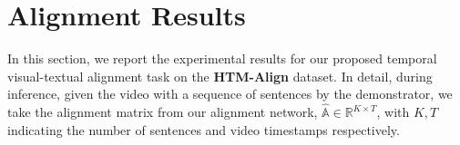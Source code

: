 \begin{comment}
\hfill
\begin{minipage}[b]{0.53\textwidth}
\centering
\footnotesize
\setlength\tabcolsep{4pt}

\begin{tabular}{c|ccc|c|cccc}
    \hline
    & \multicolumn{3}{c|}{losses} & settings  & \multicolumn{3}{c}{results on HTM-Align}               \\ \hline
    \# & $\mathcal{L}_{\text{TC}}$ & $\mathcal{L}_{\text{alignability}}$  & $\mathcal{L}_{\text{Order}}$  & {video length (s)} & Align-R@1$\uparrow$ & Align-Score$\uparrow$ & ROC AUC$\uparrow$ \\ \hline
    (a) & \multicolumn{3}{l|}{initialized with $\hat{\mathcal{L}}_{\text{TC}}$} & 128 & 32.5  & 22.0 & 69.9  \\ \hline
    (b) & \cmark & \xmark   & \xmark  & 128    & 33.8       & 22.2 & 72.0                 \\
    (c) & \cmark & \cmark   & \xmark  & 128    & \textbf{35.2}       & 23.2 & 75.5                 \\ 
    (d) & \cmark & \cmark   & \cmark  & 128    & 35.0       & \textbf{23.5} & \textbf{76.4}        \\\hline
    (e) & \cmark & \cmark   & \cmark  & 64    & 33.7     & 22.5    & 74.5   \\ 
    (f) & \cmark & \cmark   & \cmark  & 256   & 34.8    & 23.3    & 76.0   \\\hline
    \end{tabular}
\caption{Detailed ablation study of multiple losses, evaluated by alignment tasks on the \textbf{HTM-Align} dataset.}
\label{table:ablation_loss}
\end{minipage}

#	Train set	Transformer	Self-training	Align-R@1	Align-Score	ROC AUC
(1)	HTM-180K (cooking, cleaned)	✓ ✓ 35.0	23.5	73.3
(2)	HTM-180K (cooking, cleaned)	✓ × 32.5	22.0	69.9
(3)	HTM Full (original)	✓ × 32.1	21.3	70.6

# heads	enc1+dec1	enc3+dec3	enc6+dec6
4 heads	-	29.8	-
8 heads	27.0	32.5	32.7
16 heads	-	31.7	-

\end{comment}

\vspace{-3mm}
\section{Alignment Results}
\vspace{-2mm}
In this section, 
we report the experimental results for our proposed temporal visual-textual alignment task on the \textbf{HTM-Align} dataset.
In detail, during inference, 
given the video with a sequence of sentences by the demonstrator,
we take the alignment matrix from our alignment network, $\hat{\mathbb{A}} \in \mathbb{R}^{K \times T}$,
with $K, T$ indicating the number of sentences and video timestamps respectively.

